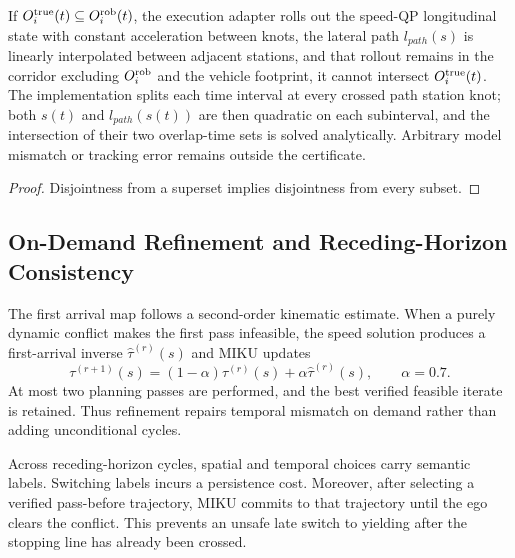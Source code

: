 \begin{proposition}
If $O_i^{\rm true}(t)\subseteq O_i^{\rm rob}(t)$, the execution adapter rolls out the speed-QP longitudinal state with constant acceleration between knots, the lateral path $l_{path}(s)$ is linearly interpolated between adjacent stations, and that rollout remains in the corridor excluding $O_i^{\rm rob}$ and the vehicle footprint, it cannot intersect $O_i^{\rm true}(t)$. The implementation splits each time interval at every crossed path station knot; both $s(t)$ and $l_{path}(s(t))$ are then quadratic on each subinterval, and the intersection of their two overlap-time sets is solved analytically. Arbitrary model mismatch or tracking error remains outside the certificate.
\end{proposition}
\begin{proof}
Disjointness from a superset implies disjointness from every subset.
\end{proof}

\subsection{On-Demand Refinement and Receding-Horizon Consistency}

The first arrival map follows a second-order kinematic estimate. When a purely dynamic conflict makes the first pass infeasible, the speed solution produces a first-arrival inverse $\hat\tau^{(r)}(s)$ and MIKU updates
\begin{equation}
 \tau^{(r+1)}(s)=(1-\alpha)\tau^{(r)}(s)+\alpha\hat\tau^{(r)}(s),
 \qquad \alpha=0.7.
 \label{eq:refinement}
\end{equation}
At most two planning passes are performed, and the best verified feasible iterate is retained. Thus refinement repairs temporal mismatch on demand rather than adding unconditional cycles.

Across receding-horizon cycles, spatial and temporal choices carry semantic labels. Switching labels incurs a persistence cost. Moreover, after selecting a verified pass-before trajectory, MIKU commits to that trajectory until the ego clears the conflict. This prevents an unsafe late switch to yielding after the stopping line has already been crossed.

